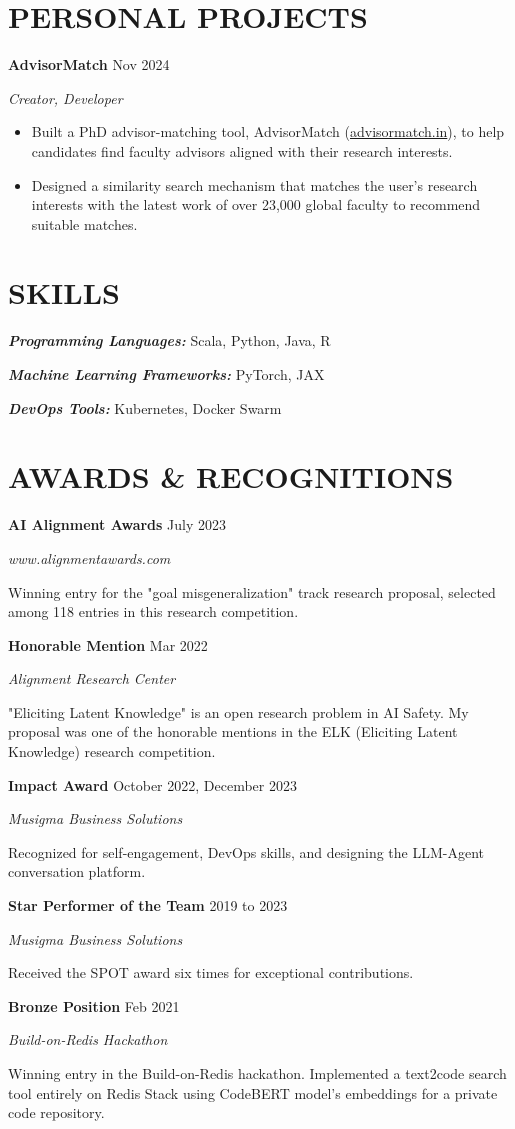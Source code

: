 \documentclass[fontsize=11pt]{article}
\newcommand{\sepspace}{\vspace*{1em}}
\newcommand{\NewPart}[1]{\section*{\uppercase{#1}}}
\newcommand{\SkillsEntry}[2]{
    \noindent\textbf{\textit{#1}} \hspace{1.5em} #2 \par}
\newcommand{\ProjectEntry}[4]{
    \noindent \textbf{#1} \hfill {#2} \par
    \noindent \textit{#3} \par
    \noindent \small #4
    \normalsize \par}
\newcommand{\AwardEntry}[4]{
    \noindent \textbf{#1} \hfill {#2} \par
    \noindent \textit{#3} \par
    \noindent \small #4
    \normalsize \par}
\begin{document}
\NewPart{PERSONAL PROJECTS}

\ProjectEntry{AdvisorMatch}{Nov 2024}{Creator, Developer}
{%
\begin{itemize}
\item Built a PhD advisor-matching tool, AdvisorMatch (\href{https://advisormatch.in}{advisormatch.in}), to help candidates find faculty advisors aligned with their research interests.
\item Designed a similarity search mechanism that matches the user's research interests with the latest work of over 23,000 global faculty to recommend suitable matches.
\end{itemize}}

\NewPart{SKILLS}
\SkillsEntry{Programming Languages:}{Scala, Python, Java, R}
\SkillsEntry{Machine Learning Frameworks:}{PyTorch, JAX}
\SkillsEntry{DevOps Tools:}{Kubernetes, Docker Swarm}

\NewPart{AWARDS \& RECOGNITIONS}

\AwardEntry{AI Alignment Awards}{July 2023}{www.alignmentawards.com}
{Winning entry for the "goal misgeneralization" track research proposal, selected among 118 entries in this research competition.}

\sepspace

\AwardEntry{Honorable Mention}{Mar 2022}{Alignment Research Center}
{"Eliciting Latent Knowledge" is an open research problem in AI Safety. My proposal was one of the honorable mentions in the ELK (Eliciting Latent Knowledge) research competition.}

\sepspace

\AwardEntry{Impact Award}{October 2022, December 2023}{Musigma Business Solutions}
{Recognized for self-engagement, DevOps skills, and designing the LLM-Agent conversation platform.}

\sepspace

\AwardEntry{Star Performer of the Team}{2019 to 2023}{Musigma Business Solutions}
{Received the SPOT award six times for exceptional contributions.}

\sepspace

\AwardEntry{Bronze Position}{Feb 2021}{Build-on-Redis Hackathon}
{Winning entry in the Build-on-Redis hackathon. Implemented a text2code search tool entirely on Redis Stack using CodeBERT model's embeddings for a private code repository.}
\end{document}
